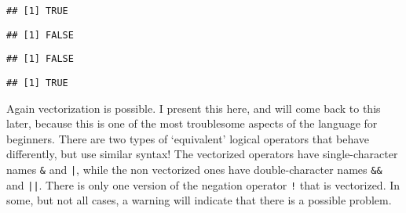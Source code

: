 \documentclass[paper=a4,10pt,div=17,headsepline,BCOR=12mm,twoside,open=right]{scrbook}\usepackage{knitr}
\begin{document}
\begin{knitrout}\footnotesize
{}\color{fgcolor}\begin{kframe}
\begin{alltt}
 \hlkwb{<-} 
 \hlkwb{<-} 
\end{alltt}
\begin{verbatim}
## [1] TRUE
\end{verbatim}
\begin{alltt}
\hlopt{!} 
\end{alltt}
\begin{verbatim}
## [1] FALSE
\end{verbatim}
\begin{alltt}
 \hlopt{&&}  
\end{alltt}
\begin{verbatim}
## [1] FALSE
\end{verbatim}
\begin{alltt}
 \hlopt{||}  
\end{alltt}
\begin{verbatim}
## [1] TRUE
\end{verbatim}
\end{kframe}
\end{knitrout}

Again vectorization is possible. I present this here, and will come back to this later, because this is one of the most troublesome aspects of the \R language for beginners. There are two types of `equivalent' logical operators that behave differently, but use similar syntax! The vectorized operators have single-character names \verb|&| and \verb:|:, while the non vectorized ones have double-character names \verb|&&| and \verb:||:. There is only one version of the negation operator \verb|!| that is vectorized. In some, but not all cases, a warning will indicate that there is a possible problem.
\end{document}
